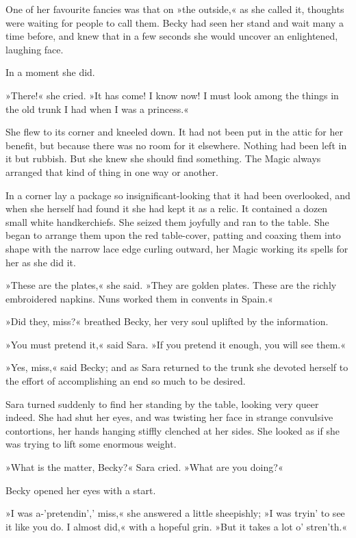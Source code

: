 One of her favourite fancies was that on »the outside,« as she called it, thoughts were waiting for people to call them. Becky had seen her stand and wait many a time before, and knew that in a few seconds she would uncover an enlightened, laughing face.

In a moment she did.

»There!« she cried. »It has come! I know now! I must look among the things in the old trunk I had when I was a princess.«

She flew to its corner and kneeled down. It had not been put in the attic for her benefit, but because there was no room for it elsewhere. Nothing had been left in it but rubbish. But she knew she should find something. The Magic always arranged that kind of thing in one way or another.

In a corner lay a package so insignificant-looking that it had been overlooked, and when she herself had found it she had kept it as a relic. It contained a dozen small white handkerchiefs. She seized them joyfully and ran to the table. She began to arrange them upon the red table-cover, patting and coaxing them into shape with the narrow lace edge curling outward, her Magic working its spells for her as she did it.

»These are the plates,« she said. »They are golden plates. These are the richly embroidered napkins. Nuns worked them in convents in Spain.«

»Did they, miss?« breathed Becky, her very soul uplifted by the information.

»You must pretend it,« said Sara. »If you pretend it enough, you will see them.«

»Yes, miss,« said Becky; and as Sara returned to the trunk she devoted herself to the effort of accomplishing an end so much to be desired.

Sara turned suddenly to find her standing by the table, looking very queer indeed. She had shut her eyes, and was twisting her face in strange convulsive contortions, her hands hanging stiffly clenched at her sides. She looked as if she was trying to lift some enormous weight.

»What is the matter, Becky?« Sara cried. »What are you doing?«

Becky opened her eyes with a start.

»I was a-'pretendin',' miss,« she answered a little sheepishly; »I was tryin' to see it like you do. I almost did,« with a hopeful grin. »But it takes a lot o' stren'th.«

